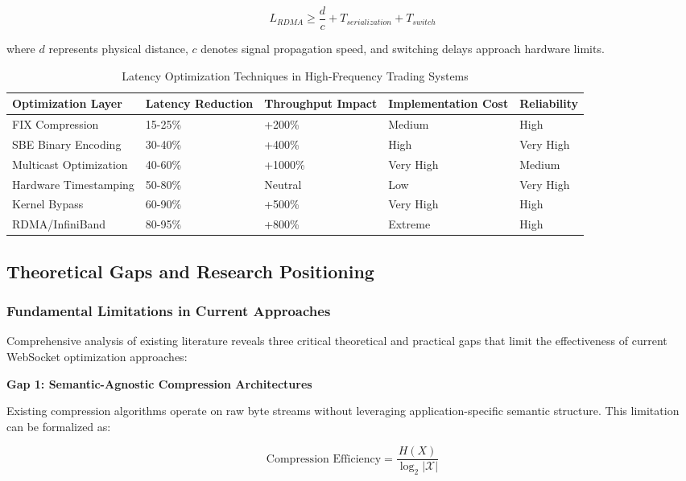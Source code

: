 \documentclass[12pt,a4paper]{article}
\begin{document}
$$L_{RDMA} \geq \frac{d}{c} + T_{serialization} + T_{switch}$$

where $d$ represents physical distance, $c$ denotes signal propagation speed, and switching delays approach hardware limits.

\begin{table}[H]
\centering
\begin{tabular}{|l|l|l|l|l|}
\hline
\textbf{Optimization Layer} & \textbf{Latency Reduction} & \textbf{Throughput Impact} & \textbf{Implementation Cost} & \textbf{Reliability} \\
\hline
FIX Compression & 15-25\% & +200\% & Medium & High \\
SBE Binary Encoding & 30-40\% & +400\% & High & Very High \\
Multicast Optimization & 40-60\% & +1000\% & Very High & Medium \\
Hardware Timestamping & 50-80\% & Neutral & Low & Very High \\
Kernel Bypass & 60-90\% & +500\% & Very High & High \\
RDMA/InfiniBand & 80-95\% & +800\% & Extreme & High \\
\hline
\end{tabular}
\caption{Latency Optimization Techniques in High-Frequency Trading Systems}
\label{tab:hft-optimizations}
\end{table}

\subsection{Theoretical Gaps and Research Positioning}

\subsubsection{Fundamental Limitations in Current Approaches}

Comprehensive analysis of existing literature reveals three critical theoretical and practical gaps that limit the effectiveness of current WebSocket optimization approaches:

\textbf{Gap 1: Semantic-Agnostic Compression Architectures}

Existing compression algorithms operate on raw byte streams without leveraging application-specific semantic structure. This limitation can be formalized as:

$$\text{Compression Efficiency} = \frac{H(X)}{\log_2|\mathcal{X}|}$$
\end{document}
